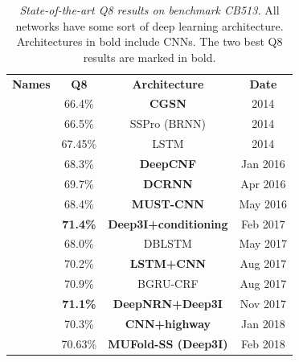 \begin{table}
	\begin{tabular}{cccc}
		\textbf{Names} & \textbf{Q8} & \textbf{Architecture} & \textbf{Date} \\
		\cite{Zhou2014}    & 66.4\%     & \textbf{CGSN}             & 2014 \\ 
		\cite{Magnan2014} & 66.5\% & SSPro (BRNN) & 2014 \\
		\cite{Sønderby2014}    & 67.45\%     & LSTM             & 2014     \\ 
		\cite{Wang2016} & 68.3\% & \textbf{DeepCNF}     & Jan 2016 \\ 
		\cite{Li2016}    & 69.7\%     & \textbf{DCRNN}         & Apr 2016 \\
		\cite{Lin2016}     & 68.4\%     & \textbf{MUST-CNN}         & May 2016 \\
		\cite{Busia2017}& \textbf{71.4\%}& \textbf{Deep3I+conditioning}& Feb 2017 \\
		\cite{Hattori2017} & 68.0\%    & DBLSTM        & May 2017 \\
		\cite{Jurtz2017} & 70.2\%    & \textbf{LSTM+CNN}         & Aug 2017 \\
		\cite{Johansen2017} & 70.9\% & BGRU-CRF & Aug 2017 \\
		\cite{8371925} & \textbf{71.1\%} & \textbf{DeepNRN+Deep3I} & Nov 2017 \\
		\cite{Zhou2018} & 70.3\% & \textbf{CNN+highway} & Jan 2018 \\
		\cite{Fang2017}& 70.63\% & \textbf{MUFold-SS (Deep3I)}&Feb 2018\\
	\end{tabular}
	\caption{\textit{State-of-the-art Q8 results on benchmark CB513.} All networks have some sort of deep learning architecture. Architectures in bold include CNNs. The two best Q8 results are marked in bold.}
	\label{tab:HoF}
\end{table}